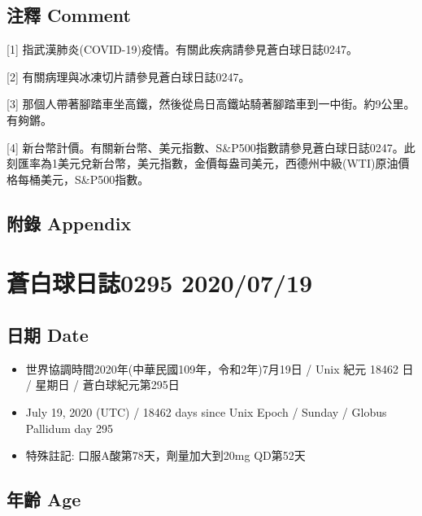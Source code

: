 \documentclass[
]{article}
\providecommand{\tightlist}{%
  \setlength{\itemsep}{0pt}\setlength{\parskip}{0pt}}
\begin{document}
\hypertarget{ux6ce8ux91cb-comment-17}{%
\subsection{注釋 Comment}\label{ux6ce8ux91cb-comment-17}}

{[}1{]} 指武漢肺炎(COVID-19)疫情。有關此疾病請參見蒼白球日誌0247。

{[}2{]} 有關病理與冰凍切片請參見蒼白球日誌0247。

{[}3{]}
那個人帶著腳踏車坐高鐵，然後從烏日高鐵站騎著腳踏車到一中街。約9公里。有夠鏘。

{[}4{]}
新台幣計價。有關新台幣、美元指數、S\&P500指數請參見蒼白球日誌0247。此刻匯率為1美元兌新台幣，美元指數，金價每盎司美元，西德州中級(WTI)原油價格每桶美元，S\&P500指數。

\hypertarget{ux9644ux9304-appendix-17}{%
\subsection{附錄 Appendix}\label{ux9644ux9304-appendix-17}}

\hypertarget{ux84bcux767dux7403ux65e5ux8a8c0295-20200719}{%
\section{蒼白球日誌0295
2020/07/19}\label{ux84bcux767dux7403ux65e5ux8a8c0295-20200719}}

\hypertarget{ux65e5ux671f-date-18}{%
\subsection{日期 Date}\label{ux65e5ux671f-date-18}}

\begin{itemize}
\tightlist
\item
  世界協調時間2020年(中華民國109年，令和2年)7月19日 / Unix 紀元 18462 日
  / 星期日 / 蒼白球紀元第295日
\item
  July 19, 2020 (UTC) / 18462 days since Unix Epoch / Sunday / Globus
  Pallidum day 295
\item
  特殊註記: 口服A酸第78天，劑量加大到20mg QD第52天
\end{itemize}

\hypertarget{ux5e74ux9f61-age-18}{%
\subsection{年齡 Age}\label{ux5e74ux9f61-age-18}}
\end{document}
